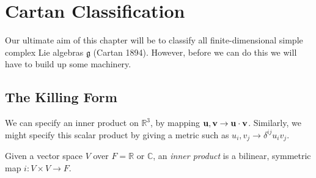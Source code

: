 \chapter{Cartan Classification}%
\label{cha:cartan_classification}

Our ultimate aim of this chapter will be to classify all finite-dimensional simple complex Lie algebras $\mathfrak{g}$ (Cartan 1894). However, before we can do this we will have to build up some machinery.

\section{The Killing Form}%
\label{sec:the_killing_form}

We can specify an inner product on $\mathbb{R}^3$, by mapping $\vb{u}, \vb{v} \to \vb{u} \cdot \vb{v}$. 
Similarly, we might specify this scalar product by giving a metric such as $u_i, v_j \to \delta^{ij} u_i v_j$.

\begin{definition}
  Given a vector space $V$ over $F = \mathbb{R}$ or $\mathbb{C}$, an \emph{inner product} is a bilinear, symmetric map $i: V \times V \to F$.
\end{definition}

